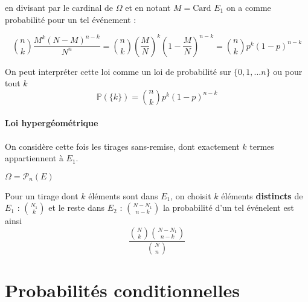 \documentclass[]{article}
\theoremstyle{remark}
\theoremstyle{definition}
\newcommand{\prob}[1]{\mathbb{P}\left(#1\right)}
\newcommand{\card}{\text{Card }}
\begin{document}
en divisant par le cardinal de $\Omega$ et en notant $M = \card E_1$ on a comme probabilité pour un tel événement :

$$\binom{n}{k} \frac{M^k(N-M)^{n - k}}{N^n} = \binom{n}{k} \left(\frac{M}{N}\right)^k\left(1 - \frac{M}{N}\right)^{n-k} = \binom{n}{k}p^k(1-p)^{n-k}$$

On peut interpréter cette loi comme un loi de probabilité sur $\{0, 1, ...n\}$ ou pour tout $k$
$$\prob{\{k\}} = \binom{n}{k}p^k(1-p)^{n-k}$$

\paragraph{Loi hypergéométrique}

On considère cette fois les tirages sans-remise, dont exactement $k$ termes appartiennent à $E_1$.

$\Omega = \mathcal{P}_n(E)$

Pour un tirage dont $k$ éléments sont dans $E_1$, on choisit $k$ éléments \textbf{distincts} de $E_1$ : $\binom{N_1}{k}$ et le reste dans $E_2$ : $\binom{N - N_1}{n - k}$ la probabilité d'un tel événelent est ainsi
$$\frac{\binom{N}{k} \binom{N - N_1}{n - k}}{\binom{N}{n}}$$

\section{Probabilités conditionnelles}
\end{document}
